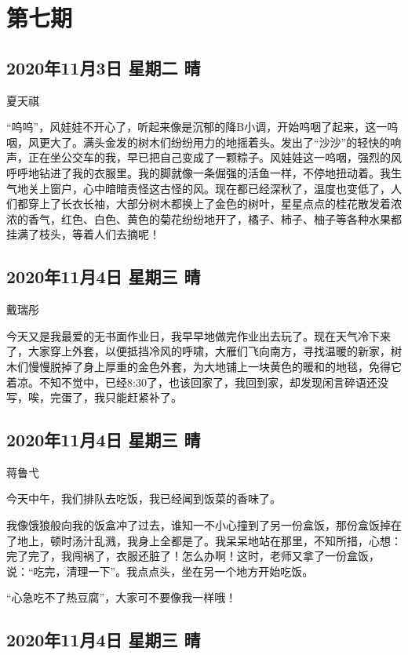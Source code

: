 \chapter{第七期}

\section{2020年11月3日 星期二 晴}

夏天祺

“呜呜”，风娃娃不开心了，听起来像是沉郁的降B小调，开始呜咽了起来，这一呜咽，风更大了。满头金发的树木们纷纷用力的地摇着头。发出了“沙沙”的轻快的响声，正在坐公交车的我，早已把自己变成了一颗粽子。风娃娃这一呜咽，强烈的风呼呼地钻进了我的衣服里。我的脚就像一条倔强的活鱼一样，不停地扭动着。我生气地关上窗户，心中暗暗责怪这古怪的风。现在都已经深秋了，温度也变低了，人们都穿上了长衣长袖，大部分树木都换上了金色的树叶，星星点点的桂花散发着浓浓的香气，红色、白色、黄色的菊花纷纷地开了，橘子、柿子、柚子等各种水果都挂满了枝头，等着人们去摘呢！

\section{2020年11月4日 星期三 晴}

戴瑞彤

今天又是我最爱的无书面作业日，我早早地做完作业出去玩了。现在天气冷下来了，大家穿上外套，以便抵挡冷风的呼啸，大雁们飞向南方，寻找温暖的新家，树木们慢慢脱掉了身上厚重的金色外套，为大地铺上一块黄色的暖和的地毯，免得它着凉。不知不觉中，已经8:30了，也该回家了，我回到家，却发现闲言碎语还没写，唉，完蛋了，我只能赶紧补了。

\section{2020年11月4日 星期三 晴}

蒋鲁弋

今天中午，我们排队去吃饭，我已经闻到饭菜的香味了。

我像饿狼般向我的饭盒冲了过去，谁知一不小心撞到了另一份盒饭，那份盒饭掉在了地上，顿时汤汁乱溅，我身上全都是了。我呆呆地站在那里，不知所措，心想：完了完了，我闯祸了，衣服还脏了！怎么办啊！这时，老师又拿了一份盒饭，说：“吃完，清理一下”。我点点头，坐在另一个地方开始吃饭。

“心急吃不了热豆腐”，大家可不要像我一样哦！

\section{2020年11月4日 星期三 晴}


